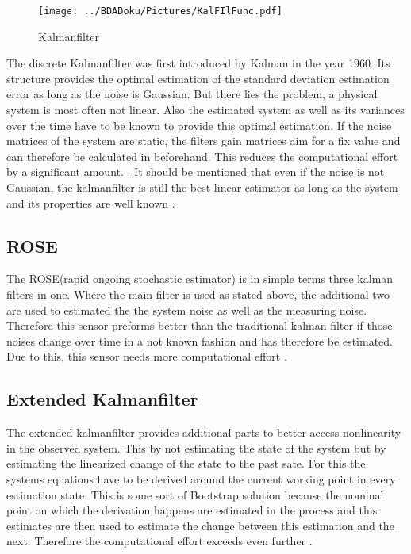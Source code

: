   \begin{figure}[h!]
  \centering
  \texttt{[image: ../BDADoku/Pictures/KalFIlFunc.pdf]}
  \caption{Kalmanfilter}
  \label{fig:Kalmanfilter}
  \end{figure}
 
  The discrete Kalmanfilter was first introduced by Kalman in the year 1960.
  Its structure provides the optimal estimation of the standard deviation estimation error as long as the noise is Gaussian.
  But there lies the problem, a physical system is most often not linear.
  Also the estimated system as well as its variances over the time have to be known to provide this optimal estimation.
  If the noise matrices of the system are static, the filters gain matrices aim for a fix value and can therefore be calculated in beforehand.
  This reduces the computational effort by a significant amount. \cite{DavidWSchultz2004}.
  It should be mentioned that even if the noise is not Gaussian, the kalmanfilter is still the best
  linear estimator as long as the system and its properties are well known \cite{SimonDan2006Ose:}.
  
  \subsection{ROSE}
  The ROSE(rapid ongoing stochastic estimator) is in simple terms three kalman filters in one.
  Where the main filter is used as stated above, the additional two are used to estimated the 
  the system noise as well as the measuring noise. Therefore this sensor preforms better than the traditional kalman filter
  if those noises change over time in a not known fashion and has therefore be estimated.
  Due to this, this sensor needs more computational effort \cite{DavidWSchultz2004}. 
  
  \subsection{Extended Kalmanfilter}
  The extended kalmanfilter provides additional parts to better access nonlinearity in the observed system.
  This by not estimating the state of the system but by estimating the linearized change of the state 
  to the past sate. For this the systems equations have to be derived around the current working point in every estimation state.
  This is some sort of Bootstrap solution because the nominal point on which the derivation happens are estimated in the process and
  this estimates are then used to estimate the change between this estimation and the next.
  Therefore the computational effort exceeds even further \cite{SimonDan2006Ose:}.
  
